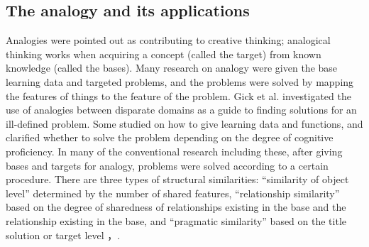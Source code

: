 \documentclass[journal]{IAENGtran}
\begin{document}
\subsection{The analogy and its applications}
\label{subsec:The analogy and its applications}
Analogies were pointed out as contributing to creative thinking\cite{Codd04}; analogical thinking works when acquiring a concept (called the target) from known knowledge (called the bases)\cite{Codd05}.
Many research on analogy were given the base learning data and targeted problems, and the problems were solved by mapping the features of things to the feature of the problem\cite{Codd06}.
Gick et al. investigated the use of analogies between disparate domains as a guide to finding solutions for an ill-defined problem.
Some studied on how to give learning data and functions\cite{Codd07}, and clarified whether to solve the problem depending on the degree of cognitive proficiency\cite{Codd08}.
In many of the conventional research including these, after giving bases and targets for analogy, problems were solved according to a certain procedure.
There are three types of structural similarities: ``similarity of object level'' determined by the number of shared features, ``relationship similarity'' based on the degree of sharedness of relationships existing in the base and the relationship existing in the base, and ``pragmatic similarity'' based on the title solution or target level \cite{Codd05}，\cite{Codd09}.
\end{document}
